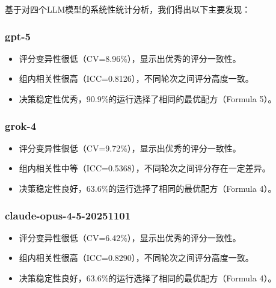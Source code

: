 \documentclass[12pt,a4paper]{article}
\begin{document}
基于对四个LLM模型的系统性统计分析，我们得出以下主要发现：

\subsubsection{gpt-5}

\begin{itemize}
    \item 评分变异性很低（CV=8.96\%），显示出优秀的评分一致性。
\end{itemize}
\begin{itemize}
    \item 组内相关性很高（ICC=0.8126），不同轮次之间评分高度一致。
\end{itemize}
\begin{itemize}
    \item 决策稳定性优秀，90.9\%的运行选择了相同的最优配方（Formula 5）。
\end{itemize}
\subsubsection{grok-4}

\begin{itemize}
    \item 评分变异性很低（CV=9.72\%），显示出优秀的评分一致性。
\end{itemize}
\begin{itemize}
    \item 组内相关性中等（ICC=0.5368），不同轮次之间评分存在一定差异。
\end{itemize}
\begin{itemize}
    \item 决策稳定性良好，63.6\%的运行选择了相同的最优配方（Formula 4）。
\end{itemize}
\subsubsection{claude-opus-4-5-20251101}

\begin{itemize}
    \item 评分变异性很低（CV=6.42\%），显示出优秀的评分一致性。
\end{itemize}
\begin{itemize}
    \item 组内相关性很高（ICC=0.8290），不同轮次之间评分高度一致。
\end{itemize}
\begin{itemize}
    \item 决策稳定性良好，63.6\%的运行选择了相同的最优配方（Formula 4）。
\end{itemize}
\end{document}
